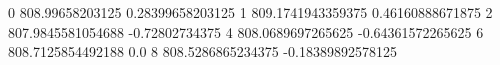 0 808.99658203125 0.28399658203125
1 809.1741943359375 0.46160888671875
2 807.9845581054688 -0.72802734375
4 808.0689697265625 -0.64361572265625
6 808.7125854492188 0.0
8 808.5286865234375 -0.18389892578125
